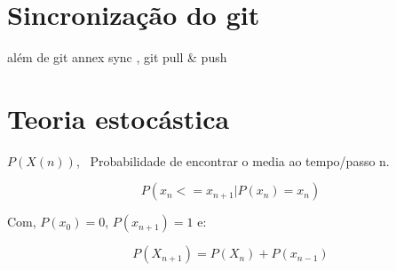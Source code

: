 \section{Sincronização do git}
além de git annex sync , git pull \& push

\section{Teoria estocástica}

$P(X(n))$, \ Probabilidade de encontrar o media ao tempo/passo n.

$$
P(x_n<=x_{n+1} | P(x_n)=x_n)
$$

Com, $P(x_0)=0$, $P(x_{n+1})=1$ e:

$$
P(X_{n+1}) = P(X_n)+P(x_{n-1})
$$











